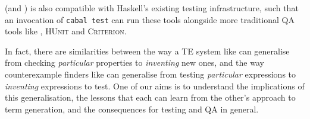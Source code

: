 \qspec{} (and \hspec{}) is also compatible with Haskell's existing testing
infrastructure, such that an invocation of \texttt{cabal test} can run these
tools alongside more traditional QA tools like \qcheck{}, \textsc{HUnit} and
\textsc{Criterion}.

In fact, there are similarities between the way a TE system like \qspec{} can
generalise from checking \emph{particular} properties to \emph{inventing} new
ones, and the way counterexample finders like \qcheck{} can generalise from
testing \emph{particular} expressions to \emph{inventing} expressions to
test. One of our aims is to understand the implications of this generalisation,
the lessons that each can learn from the other's approach to term generation,
and the consequences for testing and QA in general.








